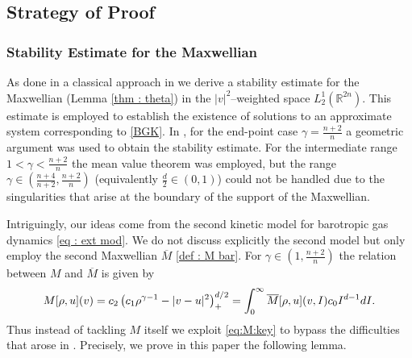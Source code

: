 \documentclass{amsart}
\theoremstyle{plain}
\theoremstyle{remark}
\newtheorem{remark}[theorem]{Remark}
\numberwithin{equation}{section}
\newcommand{\R}{\mathbb{R}}
\newcommand{\di}{\textnormal{d}I}
\newcommand{\ov}{\overline}
\begin{document}


\subsection{Strategy of Proof}
\subsubsection{Stability Estimate for the Maxwellian}
As done in a classical approach in \cite{perthamepulvirenti1993} we derive a stability estimate for the Maxwellian (Lemma \ref{thm : theta}) in the $|v|^2$--weighted space $L^1_2(\R^{2n})$. This estimate is employed to establish the existence of solutions to an approximate system corresponding to \eqref{BGK}. In \cite{choihwang2024}, for the end-point case $\gamma = \frac{n+2}{n}$ a geometric argument was used to obtain the stability estimate. For the intermediate range $1<\gamma<\frac{n+2}{n}$ the mean value theorem was employed, but the range $\gamma \in \left(\frac{n+4}{n+2},\frac{n+2}{n}\right)$ (equivalently $\frac{d}{2} \in (0,1)$) could not be handled due to the singularities that arise at the boundary of the support of the Maxwellian.

Intriguingly, our ideas come from the second kinetic model for barotropic gas dynamics \eqref{eq : ext mod}. We do not discuss explicitly the second model but only employ the second Maxwellian $\overline{M}$ %
 \eqref{def : M bar}. For $\gamma\in\left(1,\frac{n+2}{n}\right)$ the relation between $M$ and $\overline{M}$ is given by
\begin{equation}\label{eq:M:key}
M[\rho, u](v) = c_2\left(c_1 \rho^{\gamma-1} - |v-u|^2\right)_+^{d/2} = \int_{0}^{\infty} \ov{M}[\rho,u](v,I) c_0 I^{d-1} \di.
\end{equation}
Thus instead of tackling $M$ itself we exploit \eqref{eq:M:key} to bypass the difficulties that arose in \cite{choihwang2024}. Precisely, we prove in this paper the following lemma.
\end{document}
